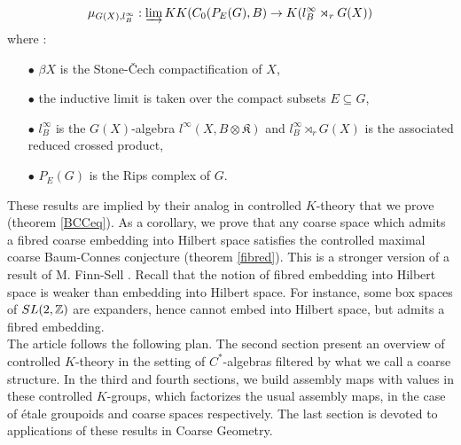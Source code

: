 \[\mu_{G(X),l^\infty_B} : \varinjlim KK(C_0(P_E(G),B) \rightarrow K(l^\infty_B\rtimes_r G(X))\]
where :
\begin{itemize}
\item[$\bullet$] $\beta X$ is the Stone-\v{C}ech compactification of $X$,
\item[$\bullet$] the inductive limit is taken over the compact subsets $E\subseteq G$,
\item[$\bullet$] $l^\infty_B$ is the $G(X)$-algebra $l^\infty (X,B\otimes \mathfrak K)$ and $l^\infty_B\rtimes_r G(X)$ is the associated reduced crossed product,
\item[$\bullet$] $P_E(G)$ is the Rips complex of $G$.
\end{itemize}
These results are implied by their analog in controlled $K$-theory that we prove (theorem \ref{BCCeq}). As a corollary, we prove that any coarse space which admits a fibred coarse embedding into Hilbert space satisfies the controlled maximal coarse Baum-Connes conjecture (theorem \ref{fibred}). This is a stronger version of a result of M. Finn-Sell \cite{FinnSellFibred}. Recall that the notion of fibred embedding into Hilbert space is weaker than embedding into Hilbert space. For instance, some box spaces of $SL(2,\mathbb Z)$ are expanders, hence cannot embed into Hilbert space, but admits a fibred embedding.\\ 

The article follows the following plan. The second section present an overview of controlled $K$-theory in the setting of $C^*$-algebras filtered by what we call a coarse structure. In the third and fourth sections, we build assembly maps with values in these controlled $K$-groups, which factorizes the usual assembly maps, in the case of étale groupoids and coarse spaces respectively. The last section is devoted to applications of these results in Coarse Geometry.










